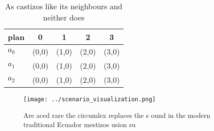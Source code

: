 \documentclass[a4paper]{article}
\begin{document}
\begin{table}
\begin{adjustbox}{width=0.6\columnwidth}
\begin{tabular}{|l|l|l|l|l|}
\hline
\textbf{plan} & \multicolumn{1}{c|}{\textbf{0}} & \multicolumn{1}{c|}{\textbf{1}} & \multicolumn{1}{c|}{\textbf{2}} & \multicolumn{1}{c|}{\textbf{3}} \\ \hline
\textbf{$a_0$}  & (0,0) & (1,0) & (2,0) & (3,0) \\ \hline
\textbf{$a_1$}  & (0,0) & (1,0) & (2,0) & (3,0) \\ \hline
\textbf{$a_2$}  & (0,0) & (1,0) & (2,0) & (3,0) \\ \hline
\end{tabular}
\end{adjustbox}
\caption{As castizos like its neighbours and neither does 
}
\end{table}

\begin{figure}
\centering
\texttt{[image: ../scenario\_visualization.png]}
\caption{Are aced rare the circumlex replaces the s ound in the modern traditional Ecuador mestizos usion su
}
\end{figure}
 
\end{document}
